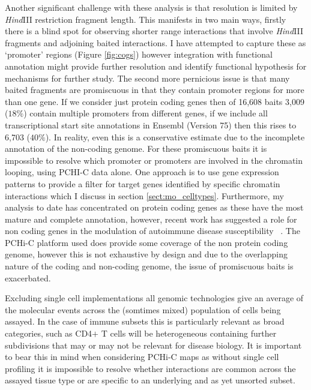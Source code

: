 \documentclass[a4paper,11pt]{report}
\begin{document}
Another significant challenge with these analysis is that resolution is limited by \textit{Hind}III restriction fragment length. This manifests in two main ways, firstly there is a blind spot for observing shorter range interactions that involve \textit{Hind}III fragments and adjoining baited interactions. I have attempted to capture these as `promoter' regions (Figure \ref{fig:cogs}) however integration with functional annotation might provide further resolution and identify functional hypothesis for mechanisms for further study. The second more pernicious issue is that many baited fragments are promiscuous in that they contain promoter regions for more than one gene. If we consider just protein coding genes then of 16,608 baits 3,009 ($18\%$) contain multiple promoters from different genes, if we include all transcriptional start site annotations in Ensembl (Version 75) then this rises to 6,703 ($40\%$). In reality, even this is a conservative estimate due to the incomplete annotation of the non-coding genome. For these promiscuous baits it is impossible to resolve which promoter or promoters are involved in the chromatin looping, using PCHI-C data alone. One approach is to use gene expression patterns to provide a filter for target genes identified by specific chromatin interactions which I discuss in section \ref{sect:mo_celltypes}. Furthermore, my analysis to date has concentrated on protein coding genes as these have the most mature and complete annotation, however,  recent work has suggested a role for non coding genes in the modulation of autoimmune disease susceptibility ~\citep{Castellanos-RubioFernandez-JimenezKratchmarovEtAl2016}. The PCHi-C platform used does provide some coverage of the non protein coding genome, however this is not exhaustive by design and due to the overlapping nature of the coding and non-coding genome, the issue of promiscuous baits is exacerbated.

Excluding single cell implementations all genomic technologies give an average of the molecular events across the (somtimes mixed) population of cells being assayed. In the case of immune subsets this is particularly relevant as broad categories, such as CD4$+$ T cells will be heterogeneous containing further subdivisions that may or may not be relevant for disease biology. It is important to bear this in mind when considering PCHi-C maps as without single cell profiling it is impossible to resolve whether interactions are common across the assayed tissue type or are specific to an underlying and as yet unsorted subset.
\end{document}
